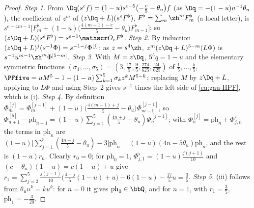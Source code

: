 \begin{proof}
\emph{Step 1.} From $\Dq(s^cf)=(1-u)s^{c-5}\bigl(-\frac c5-\theta_u\bigr)f$ (as $\Dq=-(1-u)u^{-1}\theta_u$), the coefficient of $z^m$ of $(z\Dq+L)(s^eF^\flat)$, $F^\flat=\sum_m\zh^mF^\flat_m$ (a local letter), is $s^{e-4m-1}\bigl[F^\flat_m+(1-u)\bigl(\frac{4(m-1)-e}5-\theta_u\bigr)F^\flat_{m-1}\bigr]$; so $(z\Dq+L)(s^eF^\flat)=s^{e-1}\mathscr O_eF^\flat$. \emph{Step 2.} By induction $(z\Dq+L)^j(s^{-1}\Phi)=s^{-1-j}\Phi^{[j]}$; as $z=s^4\zh$, $z^m(z\Dq+L)^{5-m}(L\Phi)$ is $s^{-1}u^{m-1}\zh^m\Phi^{[5-m]}$. \emph{Step 3.} With $M=z\Dq$, $5^5q=1-u$ and the elementary symmetric functions $(\sigma_1,\dots,\sigma_5)=(3,\frac{17}5,\frac95,\frac{274}{625},\frac{24}{625})$ of $\frac15,\dots,\frac55$, $\PFfive=uM^5-1-(1-u)\sum_{k=1}^5\sigma_kz^kM^{5-k}$; replacing $M$ by $z\Dq+L$, applying to $L\Phi$ and using Step~2 gives $s^{-1}$ times the left side of \eqref{eq:gau-HPF}, which is (i).
\emph{Step 4.} By definition $\Phi^{[j]}_m=\Phi^{[j-1]}_m+(1-u)\bigl(\frac{4(m-1)+j}5-\theta_u\bigr)\Phi^{[j-1]}_{m-1}$, so $\Phi^{[5]}_{n+1}-\mathrm{ph}_{n+1}=(1-u)\sum_{j=1}^5(\frac{4n+j}5-\theta_u)\Phi^{[j-1]}_n$; with $\Phi^{[j]}_n=\mathrm{ph}_n+\Phi^\flat_{j,n}$ the terms in $\mathrm{ph}_n$ are $(1-u)\bigl[\sum_{j=1}^5(\frac{4n+j}5-\theta_u)-3\bigr]\mathrm{ph}_n=(1-u)(4n-5\theta_u)\mathrm{ph}_n$, and the rest is $(1-u)r_n$. Clearly $r_0=0$; for $\mathrm{ph}_0=1$, $\Phi^\flat_{j,1}=(1-u)\frac{j(j+1)}{10}$ and $(c-\theta_u)(1-u)=c(1-u)+u$ give $r_1=\sum_{j=2}^5\frac{j(j-1)}{10}\bigl(\frac{4+j}5(1-u)+u\bigr)-6(1-u)-\frac{17}5u=\frac35$.
\emph{Step 5.} (iii) follows from $\theta_uu^k=ku^k$: for $n=0$ it gives $\mathrm{ph}_0\in\bbQ$, and for $n=1$, with $r_1=\frac35$, $\mathrm{ph}_1=-\frac3{20}$.
\end{proof}


